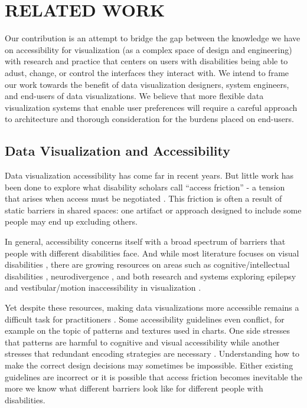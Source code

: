 \section{RELATED WORK}
Our contribution is an attempt to bridge the gap between the knowledge we have on accessibility for visualization (as a complex space of design and engineering) with research and practice that centers on users with disabilities being able to adust, change, or control the interfaces they interact with. We intend to frame our work towards the benefit of data visualization designers, system engineers, and end-users of data visualizations. We believe that more flexible data visualization systems that enable user preferences will require a careful approach to architecture and thorough consideration for the burdens placed on end-users.

\subsection{Data Visualization and Accessibility}
Data visualization accessibility has come far in recent years. But little work has been done to explore what disability scholars call ``access friction'' - a tension that arises when access must be negotiated \cite{Hsueh}. This friction is often a result of static barriers in shared spaces: one artifact or approach designed to include some people may end up excluding others.

In general, accessibility concerns itself with a broad spectrum of barriers that people with different disabilities face. And while most literature focuses on visual disabilities \cite{Wimer}, there are growing resources on areas such as cognitive/intellectual disabilities \cite{Wu}, neurodivergence \cite{Tran}, and both research and systems exploring epilepsy and vestibular/motion inaccessibility in visualization \cite{South}.


Yet despite these resources, making data visualizations more accessible remains a difficult task for practitioners \cite{Joyner}. Some accessibility guidelines even conflict, for example on the topic of patterns and textures used in charts. One side stresses that patterns are harmful to cognitive and visual accessibility while another stresses that redundant encoding strategies are necessary \cite{Elavsky2022}. Understanding how to make the correct design decisions may sometimes be impossible. Either existing guidelines are incorrect or it is possible that access friction becomes inevitable the more we know what different barriers look like for different people with disabilities.


